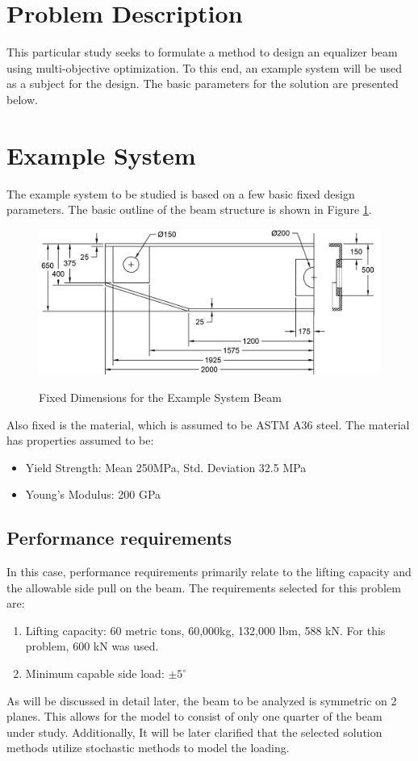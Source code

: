 \section{Problem Description}
This particular study seeks to formulate a method to design an equalizer beam using multi-objective optimization. To this end, an example system will be used as a subject for the design. The basic parameters for the solution are presented below. 

\section{Example System}
The example system to be studied is based on a few basic fixed design parameters. The basic outline of the beam structure is shown in Figure \ref{img:dim_beam}. 

\begin{figure}
\includegraphics[width=\textwidth]{img/dim_beam.png}
	\label{img:dim_beam}
	\caption{Fixed Dimensions for the Example System Beam}
\end{figure}

Also fixed is the material, which is assumed to be ASTM A36 steel. The material has properties assumed to be: 

\begin{itemize}
\item Yield Strength: Mean 250MPa, Std. Deviation 32.5 MPa
\item Young's Modulus: 200 GPa
\end{itemize}

\subsection{Performance requirements}
In this case, performance requirements primarily relate to the lifting capacity and the allowable side pull on the beam. The requirements selected for this problem are: 
\begin{enumerate}
\item Lifting capacity: 60 metric tons, 60,000kg, 132,000 lbm, 588 kN. For this problem, 600 kN was used. 
\item Minimum capable side load: $\pm 5^{\circ} $
\end{enumerate}

As will be discussed in detail later, the beam to be analyzed is symmetric on 2 planes. This allows for the model to consist of only one quarter of the beam under study. Additionally, It will be later clarified that the selected solution methods utilize stochastic methods to model the loading. 
